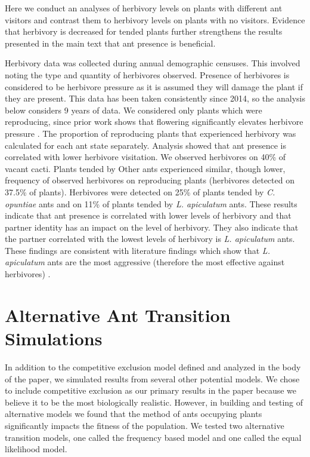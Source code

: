 \documentclass[11pt]{article}
\begin{document}
	Here we conduct  an analyses of herbivory levels on plants with different ant visitors and contrast them to herbivory levels on plants with no visitors.
	Evidence that herbivory is decreased for tended plants further strengthens the results presented in the main text that ant presence is beneficial.
	
	Herbivory data was collected during annual demographic censuses. 
	This involved noting the type and quantity of herbivores observed. 
	Presence of herbivores is considered to be herbivore pressure as it is assumed they will damage the plant if they are present.
	This data has been taken consistently since 2014, so the analysis below considers 9 years of data.
	We considered only plants which were reproducing, since prior work shows that flowering significantly elevates herbivore pressure \citep{Miller2006}.
	The proportion of reproducing plants that experienced herbivory was calculated for each ant state separately.
	Analysis showed that ant presence is correlated with lower herbivore visitation.
	We observed herbivores on 40\% of vacant cacti.
	Plants tended by Other ants experienced similar, though lower, frequency of observed herbivores on reproducing plants (herbivores detected on 37.5\% of plants).
	Herbivores were detected on 25\% of plants tended by \textit{C. opuntiae} ants and on 11\% of plants tended by \textit{L. apiculatum} ants.
	These results indicate that ant presence is correlated with lower levels of herbivory and that partner identity has an impact on the level of herbivory.
	They also indicate that the partner correlated with the lowest levels of herbivory is \textit{L. apiculatum} ants.
	These findings are consistent with literature findings which show that \textit{L. apiculatum} ants are the most aggressive (therefore the most effective against herbivores) \citep{Miller2007}.
	
	
	\begin{figure}[H]
		\caption{}
		\label{app:herb}
	\end{figure}
	
	
	
	\section{Alternative Ant Transition Simulations}\label{appendix:C}
	\renewcommand{\thefigure}{C\arabic{figure}}
	
	In addition to the competitive exclusion model defined and analyzed in the body of the paper, we simulated results from several other potential models. 
	We chose to include competitive exclusion as our primary results in the paper because we believe it to be the most biologically realistic.
	However, in building and testing of alternative models we found that the method of ants occupying plants significantly impacts the fitness of the population. 
	We tested two alternative transition models, one called the frequency based model and one called the equal likelihood model. 
	
\end{document}
